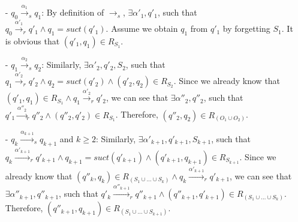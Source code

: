 \begin{itemize}
\setlength{\itemsep}{0.5pt}
\item[-] $q_0 {\xrightarrow{\alpha_1}}_s q_1$: By definition of $\rightarrow_s$, $\exists \alpha'_1, q'_1$, such that $q_0 {\xrightarrow{\alpha'_1}}_r q'_1 \wedge q_1 = suct(q'_1)$. Assume we obtain $q_1$ from $q'_1$ by forgetting $S_1$. It is obvious that $(q'_1,q_1) \in R_{S_1}$.

\item[-] $q_1 {\xrightarrow{\alpha_2}}_s q_2$: Similarly, $\exists \alpha'_2, q'_2, S_2$, such that $q_1 {\xrightarrow{\alpha'_2}}_r q'_2 \wedge q_2 = suct(q'_2) \wedge (q'_2,q_2) \in R_{S_2}$. Since we already know that $(q'_1,q_1) \in R_{S_1} \wedge q_1 {\xrightarrow{\alpha'_2}}_r q'_2$, we can see that $\exists \alpha''_2,q''_2$, such that $q'_1 {\xrightarrow{\alpha''_2}}_r q''_2 \wedge (q''_2,q'_2) \in R_{S_1}$. Therefore, $(q''_2,q_2) \in R_{( O_1 \cup O_2)}$.

\item[-] $q_k {\xrightarrow{\alpha_{\mathit{k+1}}}}_s q_{\mathit{k+1}}$ and $k \geq 2$: Similarly, $\exists \alpha'_{\mathit{k+1}}, q'_{\mathit{k+1}}, S_{\mathit{k+1}}$, such that $q_k {\xrightarrow{\alpha'_{\mathit{k+1}}}}_r q'_{\mathit{k+1}} \wedge q_{\mathit{k+1}} = suct(q'_{\mathit{k+1}}) \wedge (q'_{\mathit{k+1}},q_{\mathit{k+1}}) \in R_{S_{\mathit{k+1}}}$. Since we already know that $(q''_k,q_k) \in R_{( S_1 \cup \ldots \cup S_k )} \wedge q_k {\xrightarrow{\alpha'_\mathit{k+1}}}_r q'_{\mathit{k+1}}$, we can see that $\exists \alpha''_{\mathit{k+1}} ,q''_{\mathit{k+1}} $, such that $q'_k {\xrightarrow{\alpha''_{\mathit{k+1}} }}_r q''_{\mathit{k+1}}  \wedge (q''_{\mathit{k+1}} ,q'_{\mathit{k+1}} ) \in R_{( S_1 \cup \ldots \cup S_k )}$. Therefore, $(q''_{\mathit{k+1}} ,q_{\mathit{k+1}} ) \in R_{( S_1 \cup \ldots \cup S_{\mathit{k+1}}  )}$.
\end{itemize}




